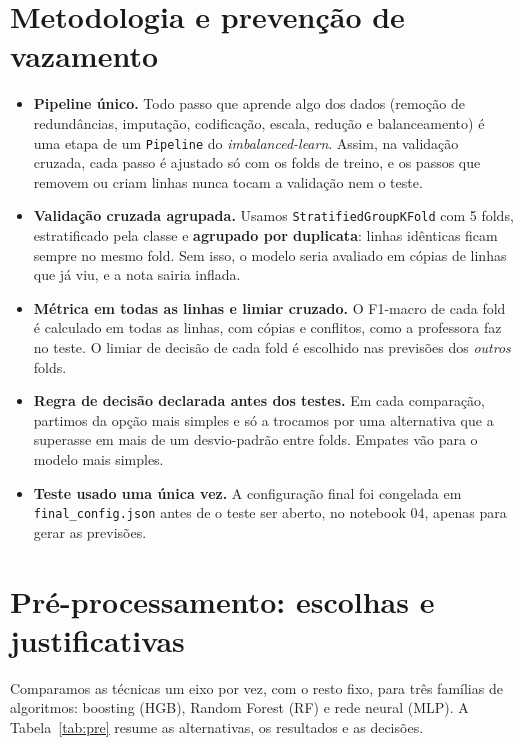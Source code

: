 \documentclass[11pt,a4paper]{article}
\begin{document}
\section{Metodologia e prevenção de vazamento}

\begin{itemize}
\item \textbf{Pipeline único.} Todo passo que aprende algo dos dados (remoção de redundâncias, imputação, codificação, escala, redução e balanceamento) é uma etapa de um \texttt{Pipeline} do \emph{imbalanced-learn}. Assim, na validação cruzada, cada passo é ajustado só com os folds de treino, e os passos que removem ou criam linhas nunca tocam a validação nem o teste.
\item \textbf{Validação cruzada agrupada.} Usamos \texttt{StratifiedGroupKFold} com 5 folds, estratificado pela classe e \textbf{agrupado por duplicata}: linhas idênticas ficam sempre no mesmo fold. Sem isso, o modelo seria avaliado em cópias de linhas que já viu, e a nota sairia inflada.
\item \textbf{Métrica em todas as linhas e limiar cruzado.} O F1-macro de cada fold é calculado em todas as linhas, com cópias e conflitos, como a professora faz no teste. O limiar de decisão de cada fold é escolhido nas previsões dos \emph{outros} folds.
\item \textbf{Regra de decisão declarada antes dos testes.} Em cada comparação, partimos da opção mais simples e só a trocamos por uma alternativa que a superasse em mais de um desvio-padrão entre folds. Empates vão para o modelo mais simples.
\item \textbf{Teste usado uma única vez.} A configuração final foi congelada em \texttt{final\_config.json} antes de o teste ser aberto, no notebook 04, apenas para gerar as previsões.
\end{itemize}

\section{Pré-processamento: escolhas e justificativas}

Comparamos as técnicas um eixo por vez, com o resto fixo, para três famílias de algoritmos: boosting (HGB), Random Forest (RF) e rede neural (MLP). A Tabela~\ref{tab:pre} resume as alternativas, os resultados e as decisões.
\end{document}
